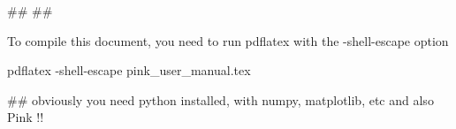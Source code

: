 ##
## 

To compile this document, you need to run pdflatex with the -shell-escape option

pdflatex -shell-escape pink_user_manual.tex

## obviously you need python installed, with numpy, matplotlib, etc and also Pink !!